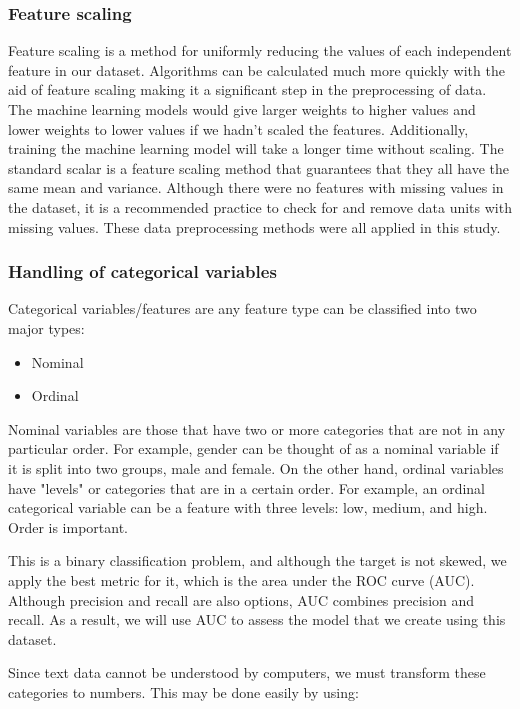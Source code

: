 \subsubsection{Feature scaling}

Feature scaling is a method for uniformly reducing the values of each independent feature in our dataset. Algorithms can be calculated much more quickly with the aid of feature scaling making it a significant step in the preprocessing of data. The machine learning models would give larger weights to higher values and lower weights to lower values if we hadn't scaled the features. Additionally, training the machine learning model will take a longer time without scaling. The standard scalar is a feature scaling method that guarantees that they all have the same mean and variance. Although there were no features with missing values in the dataset, it is a recommended practice to check for and remove data units with missing values. These data preprocessing methods were all applied in this study.

\subsubsection{Handling of categorical variables}
Categorical variables/features are any feature type can be classified into two major types:
\begin{itemize}
	\item Nominal
	\item Ordinal
\end{itemize}
Nominal variables are those that have two or more categories that are not in any particular order. For example, gender can be thought of as a nominal variable if it is split into two groups, male and female. On the other hand, ordinal variables have "levels" or categories that are in a certain order. For example, an ordinal categorical variable can be a feature with three levels: low, medium, and high. Order is important.

This is a binary classification problem, and although the target is not skewed, we apply the best metric for it, which is the area under the ROC curve (AUC). Although precision and recall are also options, AUC combines precision and recall. As a result, we will use AUC to assess the model that we create using this dataset.

Since text data cannot be understood by computers, we must transform these categories to numbers. This may be done easily by using:

